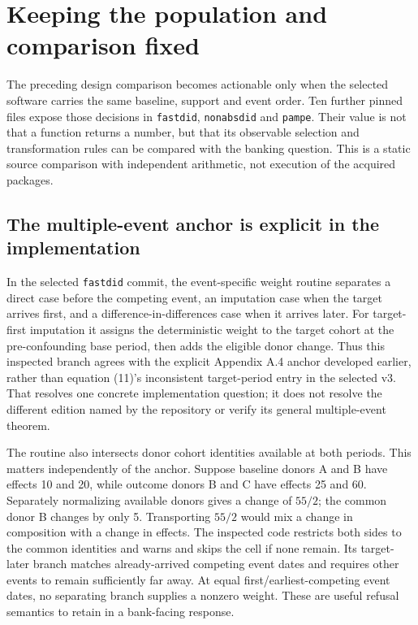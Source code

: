 \section{Keeping the population and comparison fixed}
\label{sec:exec28-panel-delegates}

The preceding design comparison becomes actionable only when the selected software carries the same baseline, support
and event order. Ten further pinned files expose those decisions in \texttt{fastdid}, \texttt{nonabsdid} and \texttt{pampe}.
Their value is not that a function returns a number, but that its observable selection and transformation rules can be
compared with the banking question. This is a static source comparison with independent arithmetic, not execution of the
acquired packages.\citep{exec28_panel_delegates}

\subsection{The multiple-event anchor is explicit in the implementation}

In the selected \texttt{fastdid} commit, the event-specific weight routine separates a direct case before the competing
event, an imputation case when the target arrives first, and a difference-in-differences case when it arrives later.
For target-first imputation it assigns the deterministic weight to the target cohort at the pre-confounding base period,
then adds the eligible donor change. Thus this inspected branch agrees with the explicit Appendix A.4 anchor developed
earlier, rather than equation (11)'s inconsistent target-period entry in the selected v3. That resolves one concrete
implementation question; it does not resolve the different edition named by the repository or verify its general
multiple-event theorem.\citep{exec28_panel_delegates}

The routine also intersects donor cohort identities available at both periods. This matters independently of the anchor.
Suppose baseline donors A and B have effects 10 and 20, while outcome donors B and C have effects 25 and 60. Separately
normalizing available donors gives a change of $55/2$; the common donor B changes by only 5. Transporting $55/2$ would
mix a change in composition with a change in effects. The inspected code restricts both sides to the common identities
and warns and skips the cell if none remain. Its target-later branch matches already-arrived competing event dates and
requires other events to remain sufficiently far away. At equal first/earliest-competing event dates, no separating branch
supplies a nonzero weight. These are useful refusal semantics to retain in a bank-facing response.\citep{exec28_panel_delegates,exec28_panel_delegate_reference}

